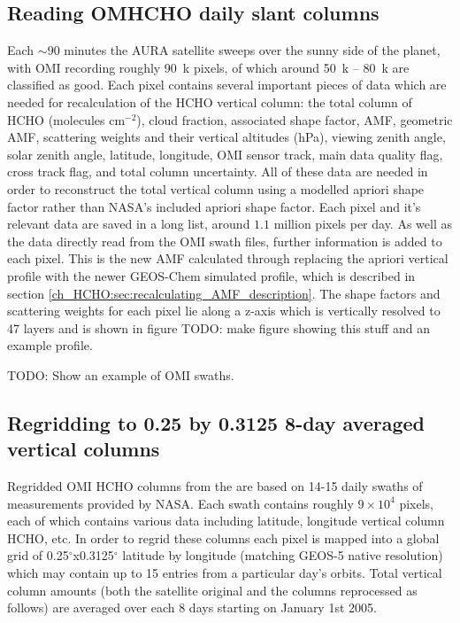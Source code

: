     
  \subsection{Reading OMHCHO daily slant columns}
    Each $\sim90$ minutes the AURA satellite sweeps over the sunny side of the planet, with OMI recording roughly 90~k pixels, of which around 50~k -- 80~k are classified as good.
    Each pixel contains several important pieces of data which are needed for recalculation of the HCHO vertical column: the total column of HCHO (molecules cm$^{-2}$), cloud fraction, associated shape factor, AMF, geometric AMF, scattering weights and their vertical altitudes (hPa), viewing zenith angle, solar zenith angle, latitude, longitude, OMI sensor track, main data quality flag, cross track flag, and total column uncertainty.
    All of these data are needed in order to reconstruct the total vertical column using a modelled apriori shape factor rather than NASA's included apriori shape factor.
    Each pixel and it's relevant data are saved in a long list, around $1.1$ million pixels per day.
    As well as the data directly read from the OMI swath files, further information is added to each pixel.
    This is the new AMF calculated through replacing the apriori vertical profile with the newer GEOS-Chem simulated profile, which is described in section \ref{ch_HCHO:sec:recalculating_AMF_description}.
    The shape factors and scattering weights for each pixel lie along a z-axis which is vertically resolved to 47 layers and is shown in figure TODO: make figure showing this stuff and an example profile.
    
    TODO: Show an example of OMI swaths.
    
  \subsection{Regridding to 0.25 by 0.3125 8-day averaged vertical columns}
    
    Regridded OMI HCHO columns from the are based on 14-15 daily swaths of measurements provided by NASA. 
    Each swath contains roughly $9 \times 10^4$ pixels, each of which contains various data including latitude, longitude vertical column HCHO, etc.
    In order to regrid these columns each pixel is mapped into a global grid of 0.25$^{\circ}$x0.3125$^{\circ}$ latitude by longitude (matching GEOS-5 native resolution) which may contain up to 15 entries from a particular day's orbits.
    Total vertical column amounts (both the satellite original and the columns reprocessed as follows) are averaged over each 8 days starting on January 1st 2005.
    

